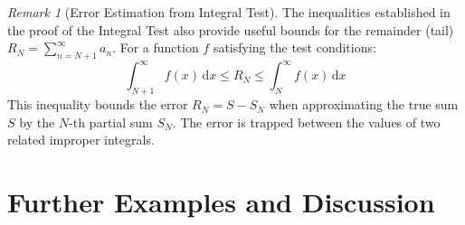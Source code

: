\documentclass[11pt, letterpaper]{article}
\theoremstyle{plain} %
\theoremstyle{definition} %
\theoremstyle{remark} %
\newtheorem{remark}[theorem]{Remark} %
\newcommand{\dx}{\,\mathrm{d}x} %
\begin{document}
\begin{remark}[Error Estimation from Integral Test]
The inequalities established in the proof of the Integral Test also provide useful bounds for the remainder (tail) $R_N = \sum_{n=N+1}^\infty a_n$. For a function $f$ satisfying the test conditions:
\[ \int_{N+1}^{\infty} f(x) \dx \le R_N \le \int_N^{\infty} f(x) \dx \]
This inequality bounds the error $R_N = S - S_N$ when approximating the true sum $S$ by the $N$-th partial sum $S_N$. The error is trapped between the values of two related improper integrals.
\end{remark}

\section{Further Examples and Discussion}
\end{document}
